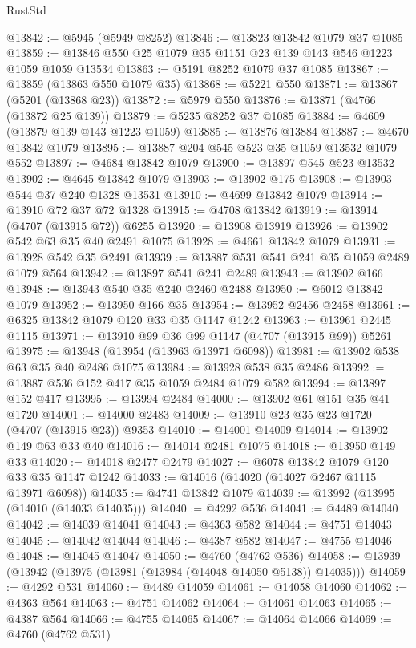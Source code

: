 \begin{lexlean}{RustStd}
\begin{coremodule}
@13842 := @5945 (@5949 @8252)
@13846 := @13823 @13842 @1079 @37 @1085
@13859 := @13846 @550 @25 @1079 @35 @1151 @23 @139 @143 @546 @1223 @1059 @1059 @13534
@13863 := @5191 @8252 @1079 @37 @1085
@13867 := @13859 (@13863 @550 @1079 @35)
@13868 := @5221 @550
@13871 := @13867 (@5201 (@13868 @23))
@13872 := @5979 @550
@13876 := @13871 (@4766 (@13872 @25 @139))
@13879 := @5235 @8252 @37 @1085
@13884 := @4609 (@13879 @139 @143 @1223 @1059)
@13885 := @13876 @13884
@13887 := @4670 @13842 @1079
@13895 := @13887 @204 @545 @523 @35 @1059 @13532 @1079 @552
@13897 := @4684 @13842 @1079
@13900 := @13897 @545 @523 @13532
@13902 := @4645 @13842 @1079
@13903 := @13902 @175
@13908 := @13903 @544 @37 @240 @1328 @13531
@13910 := @4699 @13842 @1079
@13914 := @13910 @72 @37 @72 @1328
@13915 := @4708 @13842
@13919 := @13914 (@4707 (@13915 @72)) @6255
@13920 := @13908 @13919
@13926 := @13902 @542 @63 @35 @40 @2491 @1075
@13928 := @4661 @13842 @1079
@13931 := @13928 @542 @35 @2491
@13939 := @13887 @531 @541 @241 @35 @1059 @2489 @1079 @564
@13942 := @13897 @541 @241 @2489
@13943 := @13902 @166
@13948 := @13943 @540 @35 @240 @2460 @2488
@13950 := @6012 @13842 @1079
@13952 := @13950 @166 @35
@13954 := @13952 @2456 @2458
@13961 := @6325 @13842 @1079 @120 @33 @35 @1147 @1242
@13963 := @13961 @2445 @1115
@13971 := @13910 @99 @36 @99 @1147 (@4707 (@13915 @99)) @5261
@13975 := @13948 (@13954 (@13963 @13971 @6098))
@13981 := @13902 @538 @63 @35 @40 @2486 @1075
@13984 := @13928 @538 @35 @2486
@13992 := @13887 @536 @152 @417 @35 @1059 @2484 @1079 @582
@13994 := @13897 @152 @417
@13995 := @13994 @2484
@14000 := @13902 @61 @151 @35 @41 @1720
@14001 := @14000 @2483
@14009 := @13910 @23 @35 @23 @1720 (@4707 (@13915 @23)) @9353
@14010 := @14001 @14009
@14014 := @13902 @149 @63 @33 @40
@14016 := @14014 @2481 @1075
@14018 := @13950 @149 @33
@14020 := @14018 @2477 @2479
@14027 := @6078 @13842 @1079 @120 @33 @35 @1147 @1242
@14033 := @14016 (@14020 (@14027 @2467 @1115 @13971 @6098))
@14035 := @4741 @13842 @1079
@14039 := @13992 (@13995 (@14010 (@14033 @14035)))
@14040 := @4292 @536
@14041 := @4489 @14040
@14042 := @14039 @14041
@14043 := @4363 @582
@14044 := @4751 @14043
@14045 := @14042 @14044
@14046 := @4387 @582
@14047 := @4755 @14046
@14048 := @14045 @14047
@14050 := @4760 (@4762 @536)
@14058 := @13939 (@13942 (@13975 (@13981 (@13984 (@14048 @14050 @5138)) @14035)))
@14059 := @4292 @531
@14060 := @4489 @14059
@14061 := @14058 @14060
@14062 := @4363 @564
@14063 := @4751 @14062
@14064 := @14061 @14063
@14065 := @4387 @564
@14066 := @4755 @14065
@14067 := @14064 @14066
@14069 := @4760 (@4762 @531)

\end{coremodule}
\end{lexlean}
